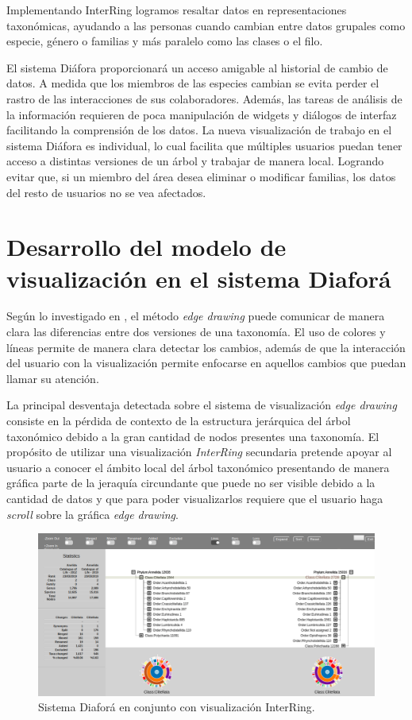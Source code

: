 \documentclass[journal]{IEEEtran}
\begin{document}
Implementando InterRing logramos resaltar datos en representaciones taxonómicas, ayudando a las personas cuando cambian entre datos grupales como especie, género o familias y más paralelo como las clases o el filo. 

El sistema Diáfora proporcionará un acceso amigable al historial de cambio de datos. A medida que los miembros de las especies cambian se evita perder el rastro de las interacciones de sus colaboradores. Además, las tareas de análisis de la información requieren de poca manipulación de widgets y diálogos de interfaz facilitando la comprensión de los datos. 
La nueva visualización de trabajo en el sistema Diáfora es individual, lo cual facilita que múltiples usuarios puedan tener acceso a distintas versiones de un árbol y trabajar de manera local. Logrando evitar que, si un miembro del área desea eliminar o modificar familias, los datos del resto de usuarios no se vea afectados.




\section{Desarrollo del modelo de visualización en el sistema Diaforá}
Según lo investigado en \cite{sancho_diafora}, el método \emph{edge drawing} puede comunicar de manera clara las
diferencias entre dos versiones de una taxonomía. El uso de colores y líneas permite de manera clara detectar los
cambios, además de que la interacción del usuario con la visualización permite enfocarse en aquellos cambios que 
puedan llamar su atención.

La principal desventaja detectada sobre el sistema de visualización \emph{edge drawing} consiste en la pérdida de contexto
de la estructura jerárquica del árbol taxonómico debido a la gran cantidad de nodos presentes una taxonomía.
El propósito de utilizar una visualización \emph{InterRing}\cite{yang_ward_rundensteiner} secundaria pretende apoyar al usuario a conocer
el ámbito local del árbol taxonómico presentando de manera gráfica parte de la jeraquía circundante que puede no ser visible debido a la cantidad de datos
y que para poder visualizarlos requiere que el usuario haga \emph{scroll} sobre la gráfica \emph{edge drawing}.

\begin{figure}[]
  \centering
  \includegraphics[scale=0.20]{extend_diafora.png}
  \caption{Sistema Diaforá en conjunto con visualización InterRing.}
  \label{}
\end{figure}
\end{document}
